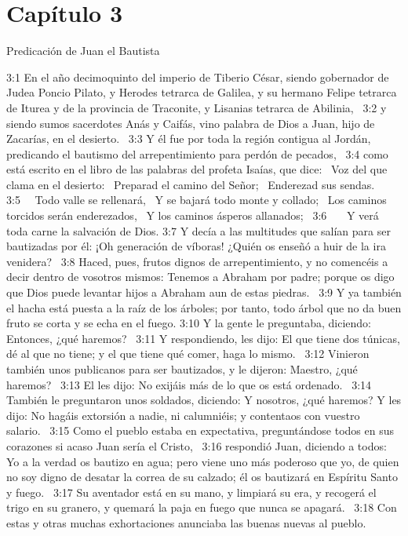 \section*{Capítulo 3}
Predicación de Juan el Bautista   

3:1 En el año decimoquinto del imperio de Tiberio César, siendo gobernador de Judea Poncio Pilato, y Herodes tetrarca de Galilea, y su hermano Felipe tetrarca de Iturea y de la provincia de Traconite, y Lisanias tetrarca de Abilinia,  
3:2 y siendo sumos sacerdotes Anás y Caifás, vino palabra de Dios a Juan, hijo de Zacarías, en el desierto.  
3:3 Y él fue por toda la región contigua al Jordán, predicando el bautismo del arrepentimiento para perdón de pecados,  
3:4 como está escrito en el libro de las palabras del profeta Isaías, que dice:  
Voz del que clama en el desierto:  
Preparad el camino del Señor;  
Enderezad sus sendas. 
3:5   Todo valle se rellenará,  
Y se bajará todo monte y collado;  
Los caminos torcidos serán enderezados,  
Y los caminos ásperos allanados;  
3:6    Y verá toda carne la salvación de Dios. 
3:7 Y decía a las multitudes que salían para ser bautizadas por él: ¡Oh generación de víboras! ¿Quién os enseñó a huir de la ira venidera?  
3:8 Haced, pues, frutos dignos de arrepentimiento, y no comencéis a decir dentro de vosotros mismos: Tenemos a Abraham por padre; porque os digo que Dios puede levantar hijos a Abraham aun de estas piedras.  
3:9 Y ya también el hacha está puesta a la raíz de los árboles; por tanto, todo árbol que no da buen fruto se corta y se echa en el fuego. 
3:10 Y la gente le preguntaba, diciendo: Entonces, ¿qué haremos?  
3:11 Y respondiendo, les dijo: El que tiene dos túnicas, dé al que no tiene; y el que tiene qué comer, haga lo mismo.  
3:12 Vinieron también unos publicanos para ser bautizados, y le dijeron: Maestro, ¿qué haremos?  
3:13 El les dijo: No exijáis más de lo que os está ordenado.  
3:14 También le preguntaron unos soldados, diciendo: Y nosotros, ¿qué haremos? Y les dijo: No hagáis extorsión a nadie, ni calumniéis; y contentaos con vuestro salario.  
3:15 Como el pueblo estaba en expectativa, preguntándose todos en sus corazones si acaso Juan sería el Cristo,  
3:16 respondió Juan, diciendo a todos: Yo a la verdad os bautizo en agua; pero viene uno más poderoso que yo, de quien no soy digno de desatar la correa de su calzado; él os bautizará en Espíritu Santo y fuego.  
3:17 Su aventador está en su mano, y limpiará su era, y recogerá el trigo en su granero, y quemará la paja en fuego que nunca se apagará.  
3:18 Con estas y otras muchas exhortaciones anunciaba las buenas nuevas al pueblo.  

